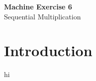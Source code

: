 \clearpage
\setcounter{page}{1}

\begin{center}
    \vspace*{3em}
    {\LARGE \textbf{Machine Exercise 6}}\\
    {\vspace{1.5em}}
    {\large Sequential Multiplication}\\
\end{center}

\section{Introduction}
    hi